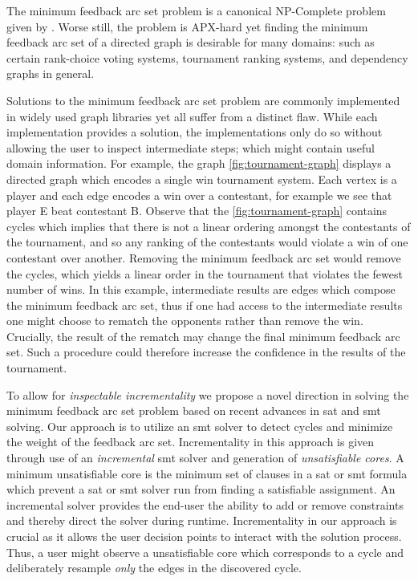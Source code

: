 \label{section:introduction}%

The minimum feedback arc set problem is a canonical NP-Complete problem given
by \citet{KarpNPComplete}. Worse still, the problem is
APX-hard yet finding the minimum feedback arc set
of a directed graph is desirable for many domains: such as certain rank-choice
voting systems, tournament ranking systems, and dependency graphs in
general.

Solutions to the minimum feedback arc set problem are commonly implemented in
widely used graph libraries yet all suffer from a distinct flaw. While each
implementation provides a solution, the implementations only do so without
allowing the user to inspect intermediate steps; which might contain useful
domain information. For example, the graph \autoref{fig:tournament-graph}
displays a directed graph which encodes a single win tournament system. Each
vertex is a player and each edge encodes a win over a contestant, for example we
see that player E beat contestant B. Observe that the
\autoref{fig:tournament-graph} contains cycles which implies that there is not a
linear ordering amongst the contestants of the tournament, and so any ranking of
the contestants would violate a win of one contestant over another. Removing the
minimum feedback arc set would remove the cycles, which yields a linear order in
the tournament that violates the fewest number of wins. In this example,
intermediate results are edges which compose the minimum feedback arc set, thus
if one had access to the intermediate results one might choose to rematch the
opponents rather than remove the win. Crucially, the result of the rematch may
change the final minimum feedback arc set. Such a procedure could therefore
increase the confidence in the results of the tournament.

To allow for \emph{inspectable incrementality} we propose a novel direction in solving the minimum feedback arc set problem based on
recent advances in \ac{sat} and \ac{smt} solving. Our approach is to utilize an
\ac{smt} solver to detect cycles and minimize the weight of the feedback arc
set. Incrementality in this approach is given through use of an
\emph{incremental} \ac{smt} solver and generation of \emph{unsatisfiable cores}.
A minimum unsatisfiable core is the minimum set of clauses in a \ac{sat} or
\ac{smt} formula which prevent a \ac{sat} or \ac{smt} solver run from finding a
satisfiable assignment. An incremental solver provides the end-user the ability
to add or remove constraints and thereby direct the solver during runtime.
Incrementality in our approach is crucial as it allows the user decision points
to interact with the solution process. Thus, a user might observe a
unsatisfiable core which corresponds to a cycle and deliberately resample
\emph{only} the edges in the discovered cycle.

